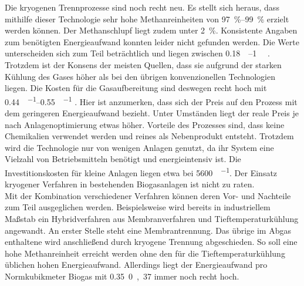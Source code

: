 Die kryogenen Trennprozesse sind noch recht neu. Es stellt sich heraus, dass mithilfe dieser Technologie sehr hohe Methanreinheiten von \SIrange{97}{99}{\percent} erzielt werden können. Der Methanschlupf liegt zudem unter \SI{2}{\percent}. Konsistente Angaben zum benötigten Energieaufwand konnten leider nicht gefunden werden. Die Werte unterscheiden sich zum Teil beträchtlich und liegen zwischen \SIrange{0,18}{1}{\kwh\normvol} \parencite{Emp18} \parencite{KGKK2019}. Trotzdem ist der Konsens der meisten Quellen, dass sie aufgrund der starken Kühlung des Gases höher als bei den übrigen konvenzionellen Technologien liegen. Die Kosten für die Gasaufbereitung sind deswegen recht hoch mit \SIrange{0,44}{0,55}{\sieuro\per\normvol} \parencite{Emp18}. Hier ist anzumerken, dass sich der Preis auf den Prozess mit dem geringeren Energieaufwand bezieht. Unter Umständen liegt der reale Preis je nach Anlagenoptimierung etwas höher. Vorteile des Prozesses sind, dass keine Chemikalien verwendet werden und reines  als Nebenprodukt entsteht. Trotzdem wird die Technologie nur von wenigen Anlagen genutzt, da ihr System eine Vielzahl von Betriebsmitteln benötigt und energieintensiv ist. Die Investitionskosten für kleine Anlagen liegen etwa bei \SI{5600}{\sieuro\per\normvolh}. Der Einsatz kryogener Verfahren in bestehenden Biogasanlagen ist nicht zu raten. \parencite{KGKK2019} \parencite{AONC2019} \\

Mit der Kombination verschiedener Verfahren können deren Vor- und Nachteile zum Teil ausgeglichen werden. Beispielsweise wird bereits in industriellem Maßstab ein Hybridverfahren aus Membranverfahren und Tieftemperaturkühlung angewandt. An erster Stelle steht eine Membrantrennung. Das übrige im Abgas enthaltene  wird anschließend durch kryogene Trennung abgeschieden. So soll eine hohe Methanreinheit erreicht werden ohne den für die Tieftemperaturkühlung üblichen hohen Energieaufwand. Allerdings liegt der Energieaufwand pro Normkubikmeter Biogas mit \SI{0,35}{0,37}{\sieuro} immer noch recht hoch. \parencite{dena2019}
\smallskip


